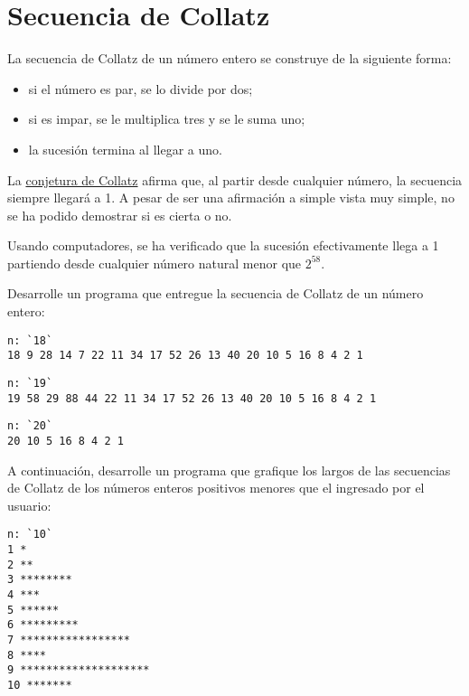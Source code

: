 \section{Secuencia de Collatz}

La secuencia de Collatz de un número entero se construye de la siguiente
forma:

\begin{itemize}
\item
  si el número es par, se lo divide por dos;
\item
  si es impar, se le multiplica tres y se le suma uno;
\item
  la sucesión termina al llegar a uno.
\end{itemize}

La \href{http://es.wikipedia.org/wiki/Conjetura\_de\_Collatz}{conjetura
de Collatz} afirma que, al partir desde cualquier número, la secuencia
siempre llegará a 1. A pesar de ser una afirmación a simple vista muy
simple, no se ha podido demostrar si es cierta o no.

Usando computadores, se ha verificado que la sucesión efectivamente
llega a 1 partiendo desde cualquier número natural menor que
\(2^{58}\).

Desarrolle un programa que entregue la secuencia de Collatz de un
número entero:

\begin{lstlisting}[language=testcase]
n: `18`
18 9 28 14 7 22 11 34 17 52 26 13 40 20 10 5 16 8 4 2 1
\end{lstlisting}

\begin{lstlisting}[language=testcase]
n: `19`
19 58 29 88 44 22 11 34 17 52 26 13 40 20 10 5 16 8 4 2 1
\end{lstlisting}

\begin{lstlisting}[language=testcase]
n: `20`
20 10 5 16 8 4 2 1
\end{lstlisting}

A continuación, desarrolle un programa que grafique los largos de las secuencias de
Collatz de los números enteros positivos menores que el ingresado por
el usuario:

\begin{lstlisting}[language=testcase]
n: `10`
1 *
2 **
3 ********
4 ***
5 ******
6 *********
7 *****************
8 ****
9 ********************
10 *******
\end{lstlisting}

